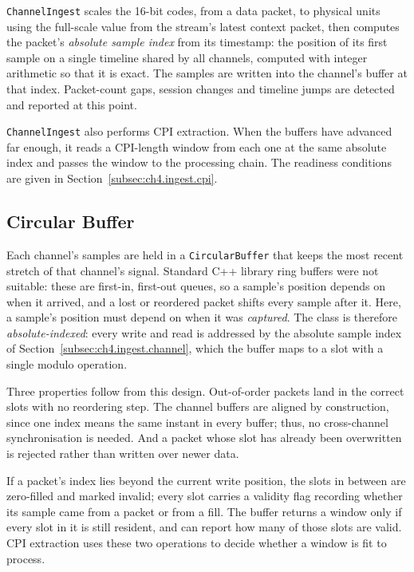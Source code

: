 \texttt{ChannelIngest} scales the 16-bit codes, from a data packet, to physical units using the full-scale value from the stream's latest context packet, then computes the packet's \emph{absolute sample index} from its timestamp: the position of its first sample on a single timeline shared by all channels, computed with integer arithmetic so that it is exact. The samples are written into the channel's buffer at that index. Packet-count gaps, session changes and timeline jumps are detected and reported at this point.

\texttt{ChannelIngest} also performs CPI extraction. When the buffers have advanced far enough, it reads a CPI-length window from each one at the same absolute index and passes the window to the processing chain. The readiness conditions are given in Section~\ref{subsec:ch4.ingest.cpi}.

\subsection{Circular Buffer}
\label{subsec:ch4.ingest.buffer}

Each channel's samples are held in a \texttt{CircularBuffer} that keeps the most recent stretch of that channel's signal. Standard C++ library ring buffers were not suitable: these are first-in, first-out queues, so a sample's position depends on when it arrived, and a lost or reordered packet shifts every sample after it. Here, a sample's position must depend on when it was \emph{captured}. The class is therefore \emph{absolute-indexed}: every write and read is addressed by the absolute sample index of Section~\ref{subsec:ch4.ingest.channel}, which the buffer maps to a slot with a single modulo operation. 

Three properties follow from this design. Out-of-order packets land in the correct slots with no reordering step. The channel buffers are aligned by construction, since one index means the same instant in every buffer; thus, no cross-channel synchronisation is needed. And a packet whose slot has already been overwritten is rejected rather than written over newer data.

If a packet's index lies beyond the current write position, the slots in between are zero-filled and marked invalid; every slot carries a validity flag recording whether its sample came from a packet or from a fill. The buffer returns a window only if every slot in it is still resident, and can report how many of those slots are valid. CPI extraction uses these two operations to decide whether a window is fit to process.

